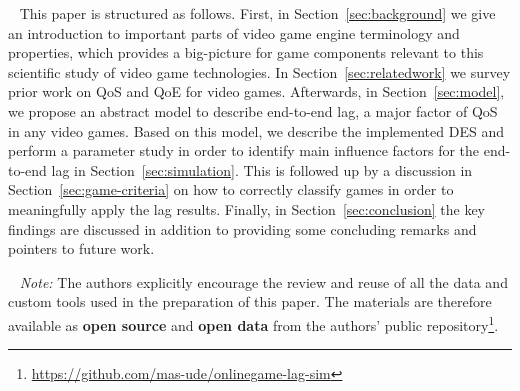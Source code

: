 ~\newline
This paper is structured as follows.
First, in Section~\ref{sec:background} we give an introduction to important parts of video game engine terminology and properties, which provides a big-picture for game components relevant to this scientific study of video game technologies.
In Section~\ref{sec:relatedwork} we survey prior work on \gls{QoS} and \gls{QoE} for video games.
Afterwards, in Section~\ref{sec:model}, we propose an abstract model to describe end-to-end lag, a major factor of \gls{QoS} in any video games. Based on this model, we describe the implemented \gls{DES} and perform a parameter study in order to identify main influence factors for the end-to-end lag in Section~\ref{sec:simulation}. This is followed up by a discussion in Section~\ref{sec:game-criteria} on how to correctly classify games in order to meaningfully apply the lag results. Finally, in Section~\ref{sec:conclusion} the key findings are discussed in addition to providing some concluding remarks and pointers to future work.

~\newline
\textit{Note:} The authors explicitly encourage the review and reuse of all the data and custom tools used in the preparation of this paper. The materials are therefore available as \textbf{open source} and \textbf{open data} from the authors' public repository\footnote{\url{https://github.com/mas-ude/onlinegame-lag-sim}}.







